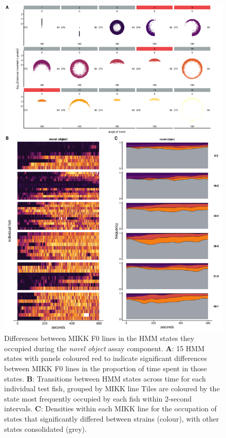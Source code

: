 \documentclass[
]{book}
\begin{document}
\begin{figure}
\includegraphics[width=1\linewidth]{figs/mikk_behaviour/select_0.08_15_sge_no} \caption{Differences between MIKK F0 lines in the HMM states they occupied during the \emph{novel object} assay component. \textbf{A}: 15 HMM states with panels coloured red to indicate significant differences between MIKK F0 lines in the proportion of time spent in those states. \textbf{B}: Transitions between HMM states across time for each individual test fish, grouped by MIKK line Tiles are coloured by the state most frequently occupied by each fish within 2-second intervals. \textbf{C}: Densities within each MIKK line for the occupation of states that significantly differed between strains (colour), with other states consolidated (grey).}\label{fig:F2-time-sge-no}
\end{figure}
\end{document}
